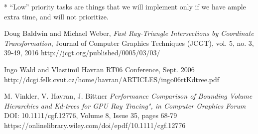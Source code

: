 \documentclass{article}
\begin{document}
* ``Low'' priority tasks are things that we will implement only if we have ample extra time, and will not prioritize.

\begin{thebibliography}{999}
Doug Baldwin and Michael Weber,
\emph{Fast Ray-Triangle Intersections by Coordinate Transformation},
Journal of Computer Graphics Techniques (JCGT), vol. 5, no. 3, 39-49, 2016
http://jcgt.org/published/0005/03/03/

Ingo Wald and Vlastimil Havran
RT06 Conference, Sept. 2006\\
http://dcgi.felk.cvut.cz/home/havran/ARTICLES/ingo06rtKdtree.pdf

M. Vinkler, V. Havran, J. Bittner
\emph{Performance Comparison of Bounding Volume Hierarchies and Kd-trees for GPU Ray Tracing", in Computer Graphics Forum}
DOI: 10.1111/cgf.12776, Volume 8, Issue 35, pages 68-79
https://onlinelibrary.wiley.com/doi/epdf/10.1111/cgf.12776

\end{thebibliography}
\end{document}
